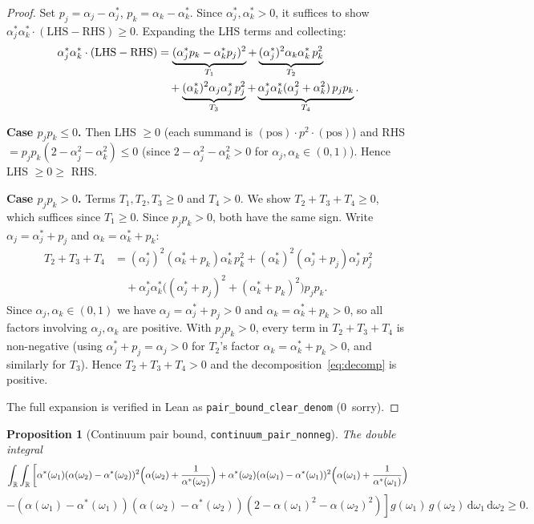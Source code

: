 \documentclass[11pt,a4paper]{article}
\newtheorem{proposition}[theorem]{Proposition}
\theoremstyle{definition}
\newcommand{\R}{\mathbb{R}}
\begin{document}
\begin{proof}
Set $p_j = \alpha_j - \alpha^*_j$, $p_k = \alpha_k - \alpha^*_k$. Since $\alpha^*_j, \alpha^*_k > 0$, it suffices to show $\alpha^*_j \alpha^*_k \cdot (\text{LHS} - \text{RHS}) \geq 0$. Expanding the LHS terms and collecting:
\begin{align}
\alpha^*_j \alpha^*_k \cdot (\text{LHS} - \text{RHS}) &= \underbrace{(\alpha^*_j p_k - \alpha^*_k p_j)^2}_{T_1} + \underbrace{(\alpha^*_j)^2 \alpha_k \alpha^*_k\, p_k^2}_{T_2} \notag \\
&\quad + \underbrace{(\alpha^*_k)^2 \alpha_j \alpha^*_j\, p_j^2}_{T_3} + \underbrace{\alpha^*_j \alpha^*_k (\alpha_j^2 + \alpha_k^2)\, p_j p_k}_{T_4}. \label{eq:decomp}
\end{align}

\textbf{Case $p_j p_k \leq 0$.} Then LHS $\geq 0$ (each summand is $(\text{pos})\cdot p^2\cdot(\text{pos})$) and RHS $= p_j p_k(2-\alpha_j^2-\alpha_k^2) \leq 0$ (since $2-\alpha_j^2-\alpha_k^2 > 0$ for $\alpha_j,\alpha_k \in (0,1)$). Hence LHS $\geq 0 \geq$ RHS.

\textbf{Case $p_j p_k > 0$.} Terms $T_1, T_2, T_3 \geq 0$ and $T_4 > 0$. We show $T_2 + T_3 + T_4 \geq 0$, which suffices since $T_1 \geq 0$. Since $p_j p_k > 0$, both have the same sign. Write $\alpha_j = \alpha^*_j + p_j$ and $\alpha_k = \alpha^*_k + p_k$:
\begin{align*}
T_2 + T_3 + T_4 &= (\alpha^*_j)^2(\alpha^*_k + p_k)\alpha^*_k\,p_k^2 + (\alpha^*_k)^2(\alpha^*_j + p_j)\alpha^*_j\,p_j^2 \\
&\quad + \alpha^*_j\alpha^*_k\bigl((\alpha^*_j+p_j)^2 + (\alpha^*_k+p_k)^2\bigr)p_jp_k.
\end{align*}
Since $\alpha_j, \alpha_k \in (0,1)$ we have $\alpha_j = \alpha^*_j + p_j > 0$ and $\alpha_k = \alpha^*_k + p_k > 0$, so all factors involving $\alpha_j, \alpha_k$ are positive. With $p_jp_k > 0$, every term in $T_2 + T_3 + T_4$ is non-negative (using $\alpha^*_j + p_j = \alpha_j > 0$ for $T_2$'s factor $\alpha_k = \alpha^*_k + p_k > 0$, and similarly for $T_3$). Hence $T_2+T_3+T_4 > 0$ and the decomposition~\eqref{eq:decomp} is positive.

The full expansion is verified in Lean as \texttt{pair\_bound\_clear\_denom} (0~sorry).
\end{proof}

\begin{proposition}[Continuum pair bound, \texttt{continuum\_pair\_nonneg}]\label{prop:cpair}
The double integral
\[
\int_\R \int_\R \left[\alpha^*(\omega_1)(\alpha(\omega_2) - \alpha^*(\omega_2))^2\Bigl(\alpha(\omega_2) + \frac{1}{\alpha^*(\omega_2)}\Bigr) + \alpha^*(\omega_2)(\alpha(\omega_1) - \alpha^*(\omega_1))^2\Bigl(\alpha(\omega_1) + \frac{1}{\alpha^*(\omega_1)}\Bigr)\right.
\]
\[
\left. - (\alpha(\omega_1) - \alpha^*(\omega_1))(\alpha(\omega_2) - \alpha^*(\omega_2))(2 - \alpha(\omega_1)^2 - \alpha(\omega_2)^2)\right] g(\omega_1)\,g(\omega_2)\,\mathrm{d}\omega_1\,\mathrm{d}\omega_2 \geq 0.
\]
\end{proposition}
\end{document}
